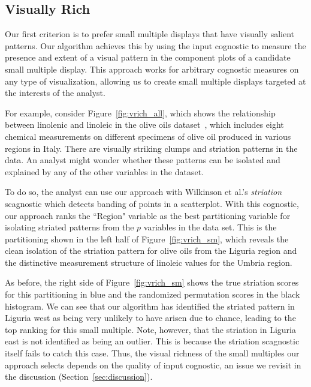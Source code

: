 \subsection{Visually Rich}
Our first criterion is to prefer small multiple displays that have visually salient patterns. Our algorithm achieves this by using the input cognostic to measure the presence and extent of a visual pattern in the component plots of a candidate small multiple display. This approach works for arbitrary cognostic measures on any type of visualization, allowing us to create small multiple displays targeted at the interests of the analyst. 

For example, consider Figure~\ref{fig:vrich_all}, which shows the relationship between linolenic and linoleic in the olive oils dataset~\cite{Forina1983}, which includes eight chemical measurements on different specimens of olive oil produced in various regions in Italy. There are visually striking clumps and striation patterns in the data. An analyst might wonder whether these patterns can be isolated and explained by any of the other variables in the dataset.

To do so, the analyst can use our approach with Wilkinson et al.'s \emph{striation} scagnostic which detects banding of points in a scatterplot. With this cognostic, our approach ranks the ``Region" variable as the best partitioning variable for isolating striated patterns from the $p$ variables in the data set. This is the partitioning shown in the left half of Figure~\ref{fig:vrich_sm}, which reveals the clean isolation of the striation pattern for olive oils from the Liguria region and the distinctive measurement structure of linoleic values for the Umbria region.

As before, the right side of Figure~\ref{fig:vrich_sm} shows the true striation scores for this partitioning in blue and the randomized permutation scores in the black histogram. We can see that our algorithm has identified the striated pattern in Liguria west as being very unlikely to have arisen due to chance, leading to the top ranking for this small multiple. 
Note, however, that the striation in Liguria east is not identified as being an outlier. This is because the striation scagnostic itself fails to catch this case. Thus, the visual richness of the small multiples our approach selects depends on the quality of input cognostic, an issue we revisit in the discussion (Section~\ref{sec:discussion}).

